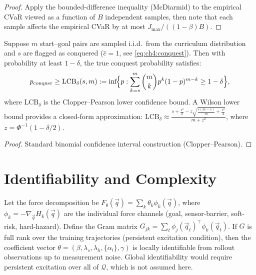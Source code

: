 \begin{proof}
Apply the bounded-difference inequality (McDiarmid) to the empirical
CVaR viewed as a function of $B$ independent samples, then note
that each sample affects the empirical CVaR by at most
$J_{\max}/((1-\beta)B)$.
\end{proof}

\begin{theorem}
\label{thm:pac_coverage}
Suppose $m$ start--goal pairs are sampled i.i.d.\ from the curriculum
distribution and $s$ are flagged as conquered
($\hat c=1$, see \eqref{eq:ch4:conquest}).
Then with probability at least $1-\delta$, the true conquest probability
satisfies:
\[
  p_{\mathrm{conquer}}
  \geq \mathrm{LCB}_\delta(s, m)
  := \inf\!\Bigl\{p : \sum_{k=s}^{m}\binom{m}{k}p^k(1-p)^{m-k}
     \geq 1-\delta\Bigr\},
\]
where $\mathrm{LCB}_\delta$ is the Clopper--Pearson lower confidence
bound.
A Wilson lower bound provides a closed-form approximation:
$\mathrm{LCB}_\delta \approx
\frac{s + \frac{z^2}{2} - z\sqrt{\frac{s(m-s)}{m}+\frac{z^2}{4}}}{m+z^2}$,
where $z = \Phi^{-1}(1-\delta/2)$.
\end{theorem}

\begin{proof}
Standard binomial confidence interval construction (Clopper--Pearson).
\end{proof}

\section{Identifiability and Complexity}
\label{app:complexity}

\begin{theorem}
\label{app:thm:identifiability}
Let the force decomposition be
$F_\theta(\vec{q}) = \sum_{k} \theta_k \phi_k(\vec{q})$,
where $\phi_k = -\nabla_{\vec{q}} H_k(\vec{q})$ are the individual
force channels (goal, sensor-barrier, soft-risk, hard-hazard).
Define the Gram matrix
$G_{jk} = \sum_t \phi_j(\vec{q}_t)^\top\phi_k(\vec{q}_t)$.
If $G$ is full rank over the training trajectories (persistent
excitation condition), then the coefficient vector
$\theta = (\beta, \lambda_s, \lambda_h, \{\alpha_i\}, \gamma)$
is locally identifiable from rollout observations up to measurement
noise.
Global identifiability would require persistent excitation over
all of $\mathcal{Q}$, which is not assumed here.
\end{theorem}

